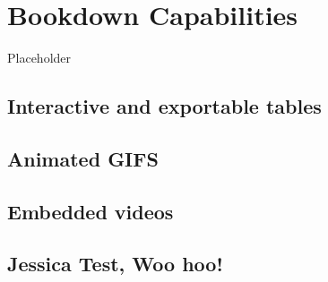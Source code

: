 \documentclass[
]{book}
\begin{document}
\hypertarget{bookdown-capabilities}{%
\chapter{Bookdown Capabilities}\label{bookdown-capabilities}}

Placeholder

\hypertarget{interactive-and-exportable-tables}{%
\section{Interactive and exportable tables}\label{interactive-and-exportable-tables}}

\hypertarget{animated-gifs}{%
\section{Animated GIFS}\label{animated-gifs}}

\hypertarget{embedded-videos}{%
\section{Embedded videos}\label{embedded-videos}}

\hypertarget{jessica-test-woo-hoo}{%
\section{Jessica Test, Woo hoo!}\label{jessica-test-woo-hoo}}

  
\end{document}
